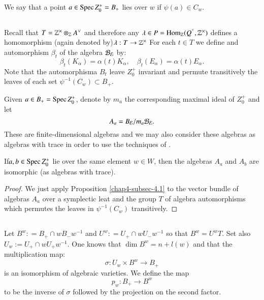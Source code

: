 We say that a point $a\in \operatorname{Spec} Z_{0}^{+}= B_{+}$ lies over $w$ if $\psi(a) \in C_{w}$. 

\subsection{}\label{chap4-subsec-4.4}
Recall that $T=\bbZ^{\times}\otimes_{\bbZ}A\spcheck$ and therefore any $\lambda \in P = \Hom_{\bbZ}(Q^{\spcheck}, \bbZ^{\times})$ defines a homomorphism (again denoted by)$\lambda: T\rightarrow \mathbb{Z}^{\times}$ For each $t\in T$ we define and automorphism $\beta_{t}$ of the algebra $\mathcal{B}_{\mathcal{E}}$ by:
$$
\beta_{t}(K_{\alpha}) = \alpha(t)K_{\alpha}, \quad \beta_{t}(E_{\alpha}) = \alpha(t)E_{\alpha}.
$$
Note that the automorphisma $B_{t}$ leave $Z_{0}^{+}$ invariant and permute transitively the leaves of each set $\psi^{-1}(C_{w})\subset B_{+}$.

Given $a\in B_{+}=\operatorname{Spec} Z_{0}^{+}$, denote by $m_{a}$ the corresponding maximal ideal of $Z_{0}^{+}$ and let 
$$
A_{a}=B_{\mathcal{E}}/m_{a}\mathcal{B}_{\mathcal{E}}.
$$
These are finite-dimensional algebras and we may also consider these algebras as algebras with trace in order to use the techniques of \cite{chap4-keyDKP2}.

\begin{theorem*}
If\pageoriginale $a,b \in \operatorname{Spec} Z_{0}^{+}$ lie over the same element $w \in W$, then the algebras $A_{a}$ and $A_{b}$ are isomorphic (as algebras with trace).
\end{theorem*}

\begin{proof}
We just apply Proposition \ref{chap4-subsec-4.1} to the vector bundle of algebras $A_{a}$ over a symplectic leat and the group $T$ of algebra automorphisms which permutes the leaves in $\psi^{-1}(C_{w})$ transitively.
\end{proof}

\subsection{}\label{chap4-subsec-4.5}
Let $B^{w}: =B_{+}\cap w B_{-}w^{-1}$ and $U^{w} : =U_{+}\cap wU_{-}w^{-1}$ so that  $B^{w} = U^{w}T$. Set also $U_{w}:=U_{+} \cap wU_{+}w^{-1}$. One knows that $\dim B^{w} = n+l(w)$ and that the multiplication map:
$$
\sigma : U_{w} \times B^{w} \rightarrow B_{+}
$$
is an isomorphism of algebraic varieties. We define the map
$$
p_{w} : B_{+} \rightarrow B^{w}
$$
to be the inverse of $\sigma$ followed by the projection on the second factor.

